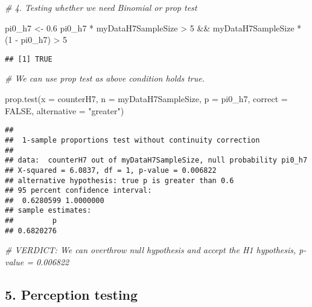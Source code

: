 \documentclass[
]{article}
\newenvironment{Shaded}{\begin{snugshade}}{\end{snugshade}}
\newcommand{\AttributeTok}[1]{\textcolor[rgb]{0.77,0.63,0.00}{#1}}
\newcommand{\CommentTok}[1]{\textcolor[rgb]{0.56,0.35,0.01}{\textit{#1}}}
\newcommand{\ConstantTok}[1]{\textcolor[rgb]{0.00,0.00,0.00}{#1}}
\newcommand{\DecValTok}[1]{\textcolor[rgb]{0.00,0.00,0.81}{#1}}
\newcommand{\FloatTok}[1]{\textcolor[rgb]{0.00,0.00,0.81}{#1}}
\newcommand{\FunctionTok}[1]{\textcolor[rgb]{0.00,0.00,0.00}{#1}}
\newcommand{\NormalTok}[1]{#1}
\newcommand{\OtherTok}[1]{\textcolor[rgb]{0.56,0.35,0.01}{#1}}
\newcommand{\SpecialCharTok}[1]{\textcolor[rgb]{0.00,0.00,0.00}{#1}}
\newcommand{\StringTok}[1]{\textcolor[rgb]{0.31,0.60,0.02}{#1}}
\begin{document}
\begin{Shaded}
\begin{Highlighting}[]
\CommentTok{\# 4. Testing whether we need Binomial or prop test}

\NormalTok{pi0\_h7 }\OtherTok{\textless{}{-}} \FloatTok{0.6}
\NormalTok{pi0\_h7 }\SpecialCharTok{*}\NormalTok{ myDataH7SampleSize }\SpecialCharTok{\textgreater{}} \DecValTok{5} \SpecialCharTok{\&\&}\NormalTok{ myDataH7SampleSize }\SpecialCharTok{*}\NormalTok{ (}\DecValTok{1} \SpecialCharTok{{-}}\NormalTok{ pi0\_h7) }\SpecialCharTok{\textgreater{}} \DecValTok{5}
\end{Highlighting}
\end{Shaded}

\begin{verbatim}
## [1] TRUE
\end{verbatim}

\begin{Shaded}
\begin{Highlighting}[]
\CommentTok{\# We can use prop test as above condition holds true.}

\FunctionTok{prop.test}\NormalTok{(}\AttributeTok{x =}\NormalTok{ counterH7, }\AttributeTok{n =}\NormalTok{ myDataH7SampleSize, }\AttributeTok{p =}\NormalTok{ pi0\_h7, }\AttributeTok{correct =} \ConstantTok{FALSE}\NormalTok{, }\AttributeTok{alternative =} \StringTok{"greater"}\NormalTok{)}
\end{Highlighting}
\end{Shaded}

\begin{verbatim}
## 
##  1-sample proportions test without continuity correction
## 
## data:  counterH7 out of myDataH7SampleSize, null probability pi0_h7
## X-squared = 6.0837, df = 1, p-value = 0.006822
## alternative hypothesis: true p is greater than 0.6
## 95 percent confidence interval:
##  0.6280599 1.0000000
## sample estimates:
##         p 
## 0.6820276
\end{verbatim}

\begin{Shaded}
\begin{Highlighting}[]
\CommentTok{\# VERDICT: We can overthrow null hypothesis and accept the H1 hypothesis, p{-}value = 0.006822}
\end{Highlighting}
\end{Shaded}

\hypertarget{perception-testing}{%
\subsection{5. Perception testing}\label{perception-testing}}
\end{document}
